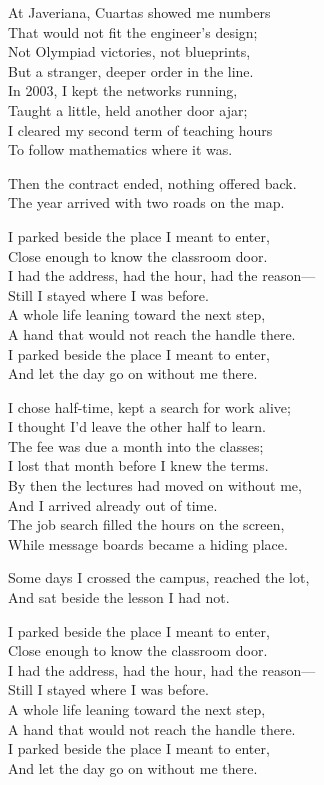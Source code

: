 \begin{lyrics}
At Javeriana, Cuartas showed me numbers\\
That would not fit the engineer’s design;\\
Not Olympiad victories, not blueprints,\\
But a stranger, deeper order in the line.\\
In 2003, I kept the networks running,\\
Taught a little, held another door ajar;\\
I cleared my second term of teaching hours\\
To follow mathematics where it was.

Then the contract ended, nothing offered back.\\
The year arrived with two roads on the map.

I parked beside the place I meant to enter,\\
Close enough to know the classroom door.\\
I had the address, had the hour, had the reason—\\
Still I stayed where I was before.\\
A whole life leaning toward the next step,\\
A hand that would not reach the handle there.\\
I parked beside the place I meant to enter,\\
And let the day go on without me there.

I chose half-time, kept a search for work alive;\\
I thought I’d leave the other half to learn.\\
The fee was due a month into the classes;\\
I lost that month before I knew the terms.\\
By then the lectures had moved on without me,\\
And I arrived already out of time.\\
The job search filled the hours on the screen,\\
While message boards became a hiding place.

Some days I crossed the campus, reached the lot,\\
And sat beside the lesson I had not.

I parked beside the place I meant to enter,\\
Close enough to know the classroom door.\\
I had the address, had the hour, had the reason—\\
Still I stayed where I was before.\\
A whole life leaning toward the next step,\\
A hand that would not reach the handle there.\\
I parked beside the place I meant to enter,\\
And let the day go on without me there.


\end{lyrics}
